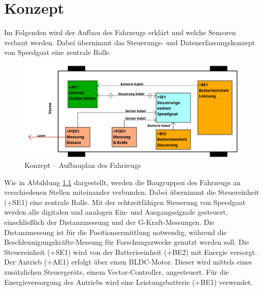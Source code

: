 \chapter{Konzept}
\label{chapter:Konzept}


Im Folgenden wird der Aufbau des Fahrzeugs erklärt und welche Sensoren verbaut werden. Dabei übernimmt das Steuerungs- und Datenerfassungskonzept von Speedgoat eine zentrale Rolle.\\
\pagebreak[1]
\begin{figure}[!ht]
	\begin{center}
		\includegraphics[width=.95\textwidth]{img/3_schaltplan/sp_aufbauplan_0.png}
		\caption{Konzept – Aufbauplan des Fahrzeugs}
		\label{img_1_1:Konzept:0}
	\end{center}
\end{figure}
\pagebreak[1]
Wie in Abbildung \ref{img_1_1:Konzept:0} dargestellt, werden die Baugruppen des Fahrzeugs an verschiedenen Stellen miteinander verbunden. Dabei übernimmt die Steuereinheit (+SE1) eine zentrale Rolle. Mit der echtzeitfähigen Steuerung von Speedgoat werden alle digitalen und analogen Ein- und Ausgangssignale gesteuert, einschließlich der Distanzmessung und der G-Kraft-Messungen. Die Distanzmessung ist für die Positionsermittlung notwendig, während die Beschleunigungskräfte-Messung für Forschungszwecke genutzt werden soll. Die Steuereinheit (+SE1) wird von der Batterieeinheit (+BE2) mit Energie versorgt.\\
Der Antrieb (+AE1) erfolgt über einen BLDC-Motor. Dieser wird mittels eines zusätzlichen Steuergeräts, einem Vector-Controller, angesteuert. Für die Energieversorgung des Antriebs wird eine Leistungsbatterie (+BE1) verwendet.

